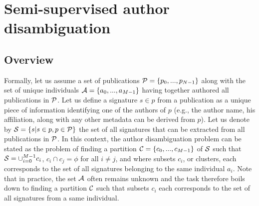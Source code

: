 \documentclass{article}
\begin{document}

\section{Semi-supervised author disambiguation}
\label{methods}

\subsection{Overview}

Formally, let us assume a set of publications ${\cal P} = \{ p_0, ...,
p_{N-1}\}$ along with the set of unique individuals ${\cal A} = \{ a_0, ...,
a_{M-1}\}$ having together authored all publications in ${\cal P}$.  Let us
define a signature $s \in p$ from a publication as a unique piece of
information identifying one of the authors of $p$ (e.g., the author name, his
affiliation, along with any other metadata can be derived from $p$). Let us
denote by ${\cal S} = \{ s | s \in p, p \in {\cal P} \}$ the set of all
signatures that can be extracted from all publications in ${\cal P}$. In this
context, the author disambiguation problem can be stated as the problem of
finding a partition ${\cal C} = \{ c_0, ..., c_{M-1} \}$ of ${\cal S}$ such
that ${\cal S} = \cup_{i=0}^{M-1} c_i$, $c_i \cap c_j = \phi$ for all $i \neq
j$, and where subsets $c_i$, or clusters, each corresponds to the set of all
signatures belonging to the same individual $a_i$. Note that in practice, the
set ${\cal A}$ often remains unknown and the task therefore boils down to
finding a partition ${\cal C}$ such that subsets   $c_i$  each corresponds to
the set of all signatures from a same individual.



\end{document}
